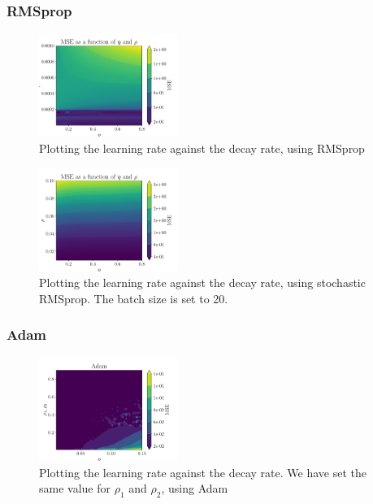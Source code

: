 \documentclass[aps,pra,english,notitlepage,reprint,nofootinbib]{revtex4-1}  %
\begin{document}
\subsubsection{RMSprop}
\begin{figure}[ht!]
    \centering
    \includegraphics[width = 0.4\textwidth]{../figs/RMS_Prop_eta_rho.pdf}
    \caption{Plotting the learning rate against the decay rate, using RMSprop}
    \label{fig: RMS_Prop_eta_rho}
\end{figure}

\begin{figure}[ht!]
    \centering
    \includegraphics[width = 0.4\textwidth]{../figs/RMS_Prop_stochastic_eta_rho.pdf}
    \caption{Plotting the learning rate against the decay rate, using stochastic RMSprop. The batch size is set to 20.}
    \label{fig: RMS_Prop_stochastic_eta_rho}
\end{figure}

\subsubsection{Adam}
\begin{figure}[ht!]
    \centering
    \includegraphics[width = 0.4\textwidth]{../figs/Adam_eta_rho.pdf}
    \caption{Plotting the learning rate against the decay rate. We have set the same value for $ρ_1$ and $ρ_2$, using Adam}
    \label{fig: Adam_eta_rho.pdf}
\end{figure}
\end{document}
